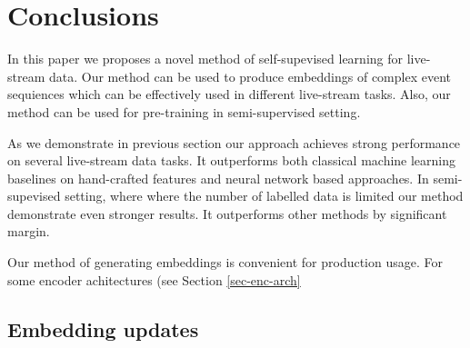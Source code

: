 \documentclass[sigconf]{acmart}
\begin{document}
\section{Conclusions} \label{sec-conclusions}

In this paper we proposes a novel method of self-supevised learning for live-stream data. Our method can be used to produce embeddings of complex event sequiences which can be effectively used in different live-stream tasks. Also, our method can be used for pre-training in semi-supervised setting.

As we demonstrate in previous section our approach achieves strong performance on several live-stream data tasks. It outperforms both classical machine learning baselines on hand-crafted features and neural network based approaches. In semi-supevised setting, where where the number of labelled data is limited our method demonstrate even stronger results. It outperforms other methods by significant margin.

Our method of generating embeddings is convenient for production usage. For some encoder achitectures (see Section \ref{sec-enc-arch}

\subsection{Embedding updates}




\end{document}
